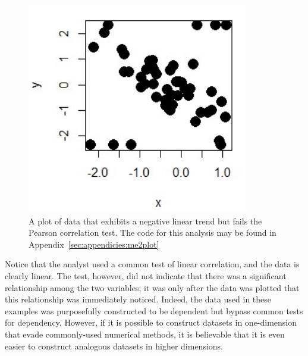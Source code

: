 \begin{figure}[htb]
	\begin{center}
		\includegraphics[width=0.5\linewidth]{ch-intro/figures/me2plot}
		\caption[A plot of data that exhibits a negative linear trend but fails the Pearson correlation test.]{A plot of data that exhibits a negative linear trend but fails the Pearson correlation test. The code for this analysis may be found in Appendix~\ref{sec:appendicies:me2plot}}
		\label{fig:intro:me2plot}
	\end{center}
\end{figure}

Notice that the analyst used a common test of linear correlation, and the data is clearly linear. The test, however, did not indicate that there was a significant relationship among the two variables; it was only after the data was plotted that this relationship was immediately noticed. Indeed, the data used in these examples was purposefully constructed to be dependent but bypass common tests for dependency. However, if it is possible to construct datasets in one-dimension that evade commonly-used numerical methods, it is believable that it is even easier to construct analogous datasets in higher dimensions.
